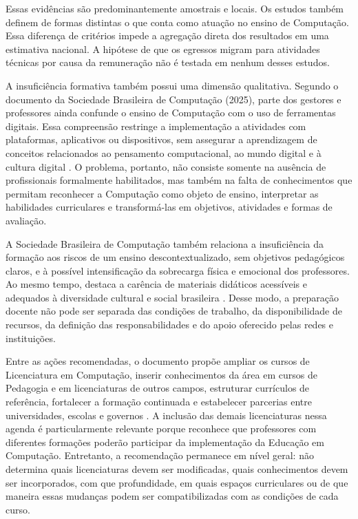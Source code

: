Essas evidências são predominantemente amostrais e locais. Os estudos também definem de formas distintas o que conta como atuação no ensino de Computação. Essa diferença de critérios impede a agregação direta dos resultados em uma estimativa nacional. A hipótese de que os egressos migram para atividades técnicas por causa da remuneração não é testada em nenhum desses estudos.

A insuficiência formativa também possui uma dimensão qualitativa. Segundo o documento da Sociedade Brasileira de Computação (2025), parte dos gestores e professores ainda confunde o ensino de Computação com o uso de ferramentas digitais. Essa compreensão restringe a implementação a atividades com plataformas, aplicativos ou dispositivos, sem assegurar a aprendizagem de conceitos relacionados ao pensamento computacional, ao mundo digital e à cultura digital \cite{sbc2025grandesdesafios}. O problema, portanto, não consiste somente na ausência de profissionais formalmente habilitados, mas também na falta de conhecimentos que permitam reconhecer a Computação como objeto de ensino, interpretar as habilidades curriculares e transformá-las em objetivos, atividades e formas de avaliação.

A Sociedade Brasileira de Computação também relaciona a insuficiência da formação aos riscos de um ensino descontextualizado, sem objetivos pedagógicos claros, e à possível intensificação da sobrecarga física e emocional dos professores. Ao mesmo tempo, destaca a carência de materiais didáticos acessíveis e adequados à diversidade cultural e social brasileira \cite{sbc2025grandesdesafios}. Desse modo, a preparação docente não pode ser separada das condições de trabalho, da disponibilidade de recursos, da definição das responsabilidades e do apoio oferecido pelas redes e instituições.

Entre as ações recomendadas, o documento propõe ampliar os cursos de Licenciatura em Computação, inserir conhecimentos da área em cursos de Pedagogia e em licenciaturas de outros campos, estruturar currículos de referência, fortalecer a formação continuada e estabelecer parcerias entre universidades, escolas e governos \cite{sbc2025grandesdesafios}. A inclusão das demais licenciaturas nessa agenda é particularmente relevante porque reconhece que professores com diferentes formações poderão participar da implementação da Educação em Computação. Entretanto, a recomendação permanece em nível geral: não determina quais licenciaturas devem ser modificadas, quais conhecimentos devem ser incorporados, com que profundidade, em quais espaços curriculares ou de que maneira essas mudanças podem ser compatibilizadas com as condições de cada curso.

